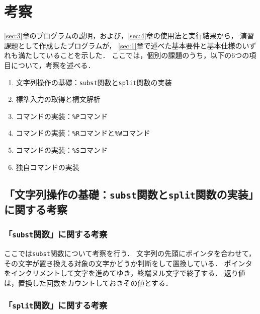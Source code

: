 \documentclass[autodetect-engine,dvi=dvipdfmx,ja=standard,
               a4j,11pt]{bxjsarticle}
\begin{document}
\section{考察} \label{sec:5}

\ref{sec:3}章のプログラムの説明，および，\ref{sec:4}章の使用法と実行結果から，
演習課題として作成したプログラムが，
\ref{sec:1}章で述べた基本要件と基本仕様のいずれも満たしていることを示した．
ここでは，個別の課題のうち，以下の6つの項目について，考察を述べる．

\begin{enumerate}
\setlength{\parskip}{2pt} \setlength{\itemsep}{2pt}
    \item 文字列操作の基礎：\verb|subst|関数と\verb|split|関数の実装
    \item 標準入力の取得と構文解析
    \item コマンドの実装：\verb|%P|コマンド
    \item コマンドの実装：\verb|%R|コマンドと\verb|%W|コマンド
    \item コマンドの実装：\verb|%S|コマンド
    \item 独自コマンドの実装
\end{enumerate}

\subsection{「文字列操作の基礎：\texttt{subst}関数と\texttt{split}関数の実装」に関する考察}

\subsubsection{「\texttt{subst}関数」に関する考察}

ここでは\verb|subst|関数について考察を行う．
文字列の先頭にポインタを合わせて，その文字が置き換える対象の文字かどうか判断をして置換している．
ポインタをインクリメントして文字を進めてゆき，終端ヌル文字で終了する．
返り値は，置換した回数をカウントしておきその値とする．

\subsubsection{「\texttt{split}関数」に関する考察}
\end{document}
